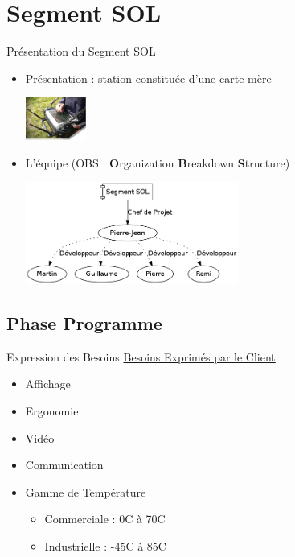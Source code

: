 \documentclass[11pt]{beamer}
\begin{document}
	
	\section{Segment SOL}
	\begin{frame}{Présentation du Segment SOL}
		\begin{itemize}
		    \item Présentation : station constituée d'une carte mère\\
		    \begin{center}
		    \includegraphics[width=2cm]{common/segment.png}\\
		    \end{center}
		    \pause
		    \item L'équipe (OBS : \textbf{O}rganization \textbf{B}reakdown \textbf{S}tructure)\\
		    \pause
		    \begin{center}
		    \includegraphics[width=7cm]{common/OBS.png}
		    \end{center}
		\end{itemize}
	\end{frame}
	
	
	
	\subsection{Phase Programme}
	\begin{frame}{Expression des Besoins}
	\underline{Besoins Exprimés par le Client} :
	\newline
	\begin{itemize}
	 \item Affichage
	  \item Ergonomie
	   \item Vidéo
	    \item Communication
	    \item Gamme de Température
	    \begin{itemize}   
	    \item Commerciale : 0\textdegree C à  70\textdegree C
	    \item Industrielle :  -45\textdegree C à  85\textdegree C
	    \end{itemize}
	\end{itemize}
	\end{frame}
	
\end{document}
